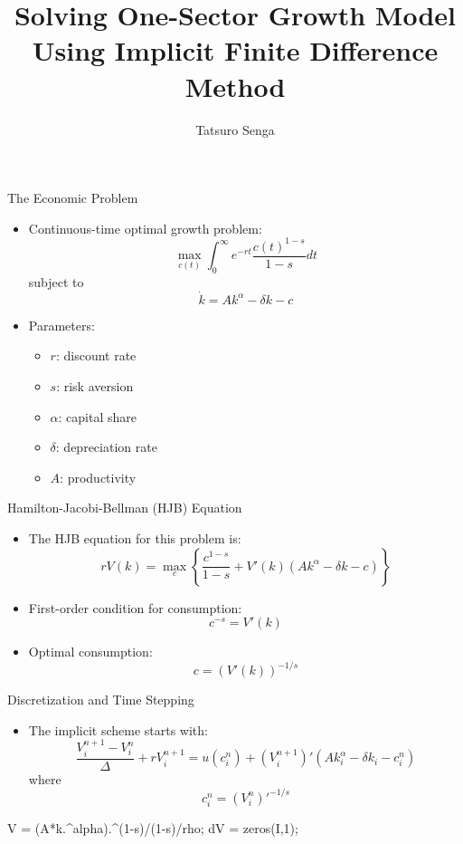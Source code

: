 \documentclass[]{beamer}
\title{Solving One-Sector Growth Model\\Using Implicit Finite Difference Method}
\author{Tatsuro Senga}
\date{}
\newenvironment{code}{\begin{semiverbatim}\footnotesize}{\end{semiverbatim}}
\begin{document}
\begin{frame}
    \titlepage
\end{frame}

\begin{frame}{The Economic Problem}
    \begin{itemize}
        \item Continuous-time optimal growth problem:
        \[\max_{c(t)} \int_0^\infty e^{-r t} \frac{c(t)^{1-s}}{1-s} dt\]
        subject to
        \[\dot{k} = Ak^\alpha - \delta k - c\]
        \item Parameters:
        \begin{itemize}
            \item $r$: discount rate
            \item $s$: risk aversion
            \item $\alpha$: capital share
            \item $\delta$: depreciation rate
            \item $A$: productivity
        \end{itemize}
    \end{itemize}
\end{frame}

\begin{frame}{Hamilton-Jacobi-Bellman (HJB) Equation}
    \begin{itemize}
        \item The HJB equation for this problem is:
        \[r V(k) = \max_c \left\{\frac{c^{1-s}}{1-s} + V'(k)(Ak^\alpha - \delta k - c)\right\}\]
        \item First-order condition for consumption:
        \[c^{-s} = V'(k)\]
        \item Optimal consumption:
        \[c = (V'(k))^{-1/s}\]
    \end{itemize}
\end{frame}

\begin{frame}{Discretization and Time Stepping}
    \begin{itemize}
        \item The implicit scheme starts with:
        \[\frac{V_i^{n+1} - V_i^n}{\Delta} + r V_i^{n+1} = u(c_i^n) + (V_i^{n+1})'(Ak_i^\alpha - \delta k_i - c_i^n)\]
        where
        \[c_i^n = (V_i^n)'^{-1/s}\]
    \end{itemize}
    \begin{code}
    V = (A*k.^alpha).^(1-s)/(1-s)/rho;
    dV = zeros(I,1);  %
    \end{code}
\end{frame}
\end{document}
